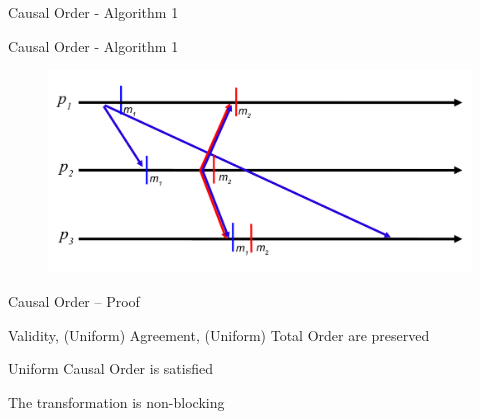 \begin{frame}[shrink]{Causal Order - Algorithm 1}

\begin{Procedure}
\caption{Causal Order Transformation executed by process $p$}

\BlankLine
{}

\end{Procedure}

\end{frame}

\begin{frame}{Causal Order - Algorithm 1}
	
\begin{figure}
	\includegraphics[width=\textwidth]{figs/04/rb-crb}
\end{figure}

\end{frame}

\begin{frame}{Causal Order -- Proof}

\BIL
\item \alert{Validity}, \alert{(Uniform) Agreement}, \alert{(Uniform) Total Order} are preserved
\item \alert{Uniform Causal Order} is satisfied
\item The transformation is non-blocking
\EIL

\end{frame}


